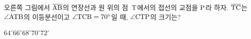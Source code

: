 \noindent\begin{minipage}[t]{0.58\linewidth}\vspace{0pt}\raggedright 오른쪽 그림에서 $\overline{\mathrm{AB}}$의 연장선과 원 위의 점~$\mathrm{T}$에서의 접선의 교점을 $\mathrm{P}$라 하자. $\overline{\mathrm{TC}}$는 $\angle\mathrm{ATB}$의 이등분선이고 $\angle\mathrm{TCB}=70^\circ$일 때, $\angle\mathrm{CTP}$의 크기는?\end{minipage}\hfill\begin{minipage}[t]{0.4\linewidth}\vspace{0pt}\centering \resizebox{\ifdim\width>\linewidth\linewidth\else\width\fi}{!}{}\end{minipage}\par
\begin{choices32}{$64^\circ$}{$66^\circ$}{$68^\circ$}{$70^\circ$}{$72^\circ$}\end{choices32}
